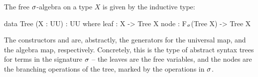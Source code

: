 \begin{definition}
    \label{algebra:tree}
    \label{def:free-algebra-construction}
    The free $\sigma$-algebra on a type $X$ is given by the inductive type:
    \begin{code}
data Tree (X : UU) : UU where
  leaf : X -> Tree X
  node : F$_\sigma$(Tree X) -> Tree X
    \end{code}
\end{definition}
\vspace*{-2em}
The constructors  and  are, abstractly,
the generators for the universal map, and the algebra map, respectively.
%
Concretely, this is the type of abstract syntax trees for terms in the signature $\sigma$
-- the leaves are the free variables, and the nodes are the branching operations of the tree,
marked by the operations in $\sigma$.



